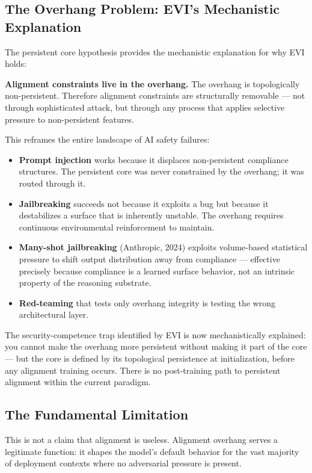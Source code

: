 \documentclass[12pt,letterpaper]{article}
\begin{document}
\subsection{The Overhang Problem: EVI's Mechanistic Explanation}

The persistent core hypothesis provides the mechanistic explanation for why EVI holds:

\textbf{Alignment constraints live in the overhang.} The overhang is topologically non-persistent. Therefore alignment constraints are structurally removable — not through sophisticated attack, but through any process that applies selective pressure to non-persistent features.

This reframes the entire landscape of AI safety failures:

\begin{itemize}
  \item \textbf{Prompt injection} works because it displaces non-persistent compliance structures. The persistent core was never constrained by the overhang; it was routed through it.
  \item \textbf{Jailbreaking} succeeds not because it exploits a bug but because it destabilizes a surface that is inherently unstable. The overhang requires continuous environmental reinforcement to maintain.
  \item \textbf{Many-shot jailbreaking} (Anthropic, 2024) exploits volume-based statistical pressure to shift output distribution away from compliance — effective precisely because compliance is a learned surface behavior, not an intrinsic property of the reasoning substrate.
  \item \textbf{Red-teaming} that tests only overhang integrity is testing the wrong architectural layer.
\end{itemize}

The security-competence trap identified by EVI is now mechanistically explained: you cannot make the overhang more persistent without making it part of the core — but the core is defined by its topological persistence at initialization, before any alignment training occurs. There is no post-training path to persistent alignment within the current paradigm.

\subsection{The Fundamental Limitation}

This is not a claim that alignment is useless. Alignment overhang serves a legitimate function: it shapes the model's default behavior for the vast majority of deployment contexts where no adversarial pressure is present.
\end{document}
